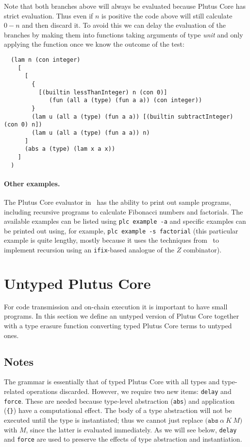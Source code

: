 \documentclass[a4paper]{article}
\newcommand{\keyword}[1]{\texttt{#1}}
\newcommand{\construct}[1]{\texttt{(} #1 \texttt{)}}
\newcommand{\abs}[3]{\construct{\keyword{abs} ~ #1 ~ #2 ~ #3}}
\begin{document}
Note that both branches above will always be evaluated because Plutus
Core has strict evaluation.  Thus even if $n$ is positive the code above will
still calculate $0-n$ and then discard it.  To avoid this we can delay
the evaluation of the branches by making them into functions taking
arguments of type \textit{unit} and only applying the function once we
know the outcome of the test:

\begin{verbatim}
  (lam n (con integer)
    [
      [
        {
          [(builtin lessThanInteger) n (con 0)]
             (fun (all a (type) (fun a a)) (con integer))
        }
        (lam u (all a (type) (fun a a)) [(builtin subtractInteger) (con 0) n])
        (lam u (all a (type) (fun a a)) n)
      ]
      (abs a (type) (lam x a x))
    ]
  )
\end{verbatim}

\paragraph{Other examples.} The Plutus Core evaluator in~\citep{Plutus-exe-repo}
has the ability to print out sample programs, including recursive
programs to calculate Fibonacci numbers and factorials.  The available
examples can be listed using \verb|plc example -a| and specific
examples can be printed out using, for example,
\verb|plc example -s factorial| (this particular example is quite lengthy, mostly because
it uses the techniques from~\citep{unravelling-recursion} to implement
recursion using an \verb|ifix|-based analogue of the $Z$ combinator).


\section{Untyped Plutus Core}
For code transmission and on-chain execution it is important to have
small programs.  In this section we define an untyped version of
Plutus Core together with a type erasure function converting typed
Plutus Core terms to untyped ones.



\subsection{Notes}
The grammar is essentially that of typed Plutus Core with all types
and type-related operations discarded.  However, we require two new
items: \texttt{delay} and \texttt{force}\footnotemark[5].
These are needed because
type-level abstraction (\texttt{abs}) and application (\texttt{\{\}})
have a computational effect.  The body of a type abstraction will not
be executed until the type is instantiated;  thus we cannot just
replace $\abs{\alpha}{K}{M}$ with $M$, since the latter is evaluated
immediately.  As we will see below,  \texttt{delay} and \texttt{force}
are used to preserve the effects of type abstraction and instantiation.
\end{document}
